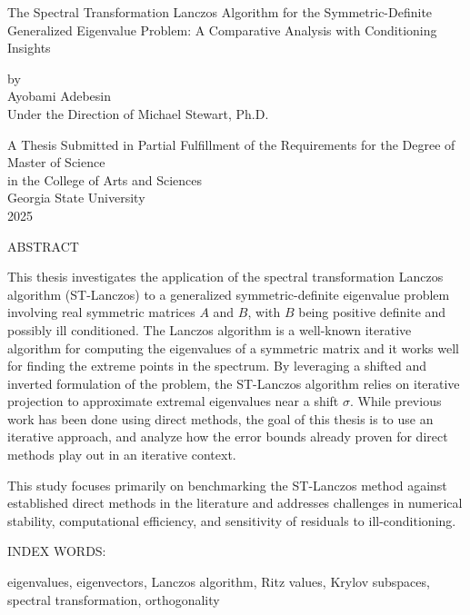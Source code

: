 \pagestyle{empty}
\begin{center}
The Spectral Transformation Lanczos Algorithm for the Symmetric-Definite Generalized Eigenvalue Problem: A Comparative Analysis with Conditioning Insights

\vspace{.9in}
by\\
\vspace{.9in}
Ayobami Adebesin\\
\vspace{.9in}
Under the Direction of Michael Stewart, Ph.D. \\
\vspace{2in}

A Thesis Submitted in Partial Fulfillment of the Requirements for the Degree of\\  %
\vspace{.2in}
Master of Science \\
\vspace{.2in}
in the College of Arts and Sciences \\
\vspace{.2in}
Georgia State University \\
\vspace{.2in}
2025
\pagebreak 



ABSTRACT\\
\bigskip
\end{center}

\begin{flushleft}
	\justify
	This thesis investigates the application of the spectral transformation Lanczos algorithm (ST-Lanczos) to a generalized symmetric-definite eigenvalue problem involving real symmetric matrices $A$ and $B$, with $B$ being positive definite and possibly ill conditioned. The Lanczos algorithm is a well-known iterative algorithm for computing the eigenvalues of a symmetric matrix and it works well for finding the extreme points in the spectrum. By leveraging a shifted and inverted formulation of the problem, the ST-Lanczos algorithm relies on iterative projection to approximate extremal eigenvalues near a shift $\sigma$. While previous work has been done using direct methods, the goal of this thesis is to use an iterative approach, and analyze how the error bounds already proven for direct methods play out in an iterative context.

    This study focuses primarily on benchmarking the ST-Lanczos method against established direct methods in the literature and addresses challenges in numerical stability, computational efficiency, and sensitivity of residuals to ill-conditioning.
\end{flushleft}
\vfill
\begin{singlespace}
\noindent INDEX WORDS:
\hspace{0.2in}
\parbox[t]{4.5in}{
  eigenvalues, eigenvectors, Lanczos algorithm, Ritz values, Krylov subspaces, spectral transformation, orthogonality}
\end{singlespace} 
